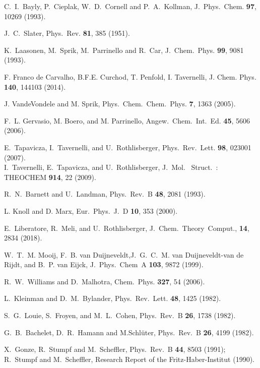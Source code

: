 \documentclass[twoside,10pt,titlepage,a4paper]{article}
\begin{document}
\begin{thebibliography}{999}
    C.~I.~Bayly, P.~Cieplak, W.~D.~Cornell and P.~A.~Kollman,
    J.~Phys.~Chem. {\bf 97}, 10269 (1993).

    J.~C.~Slater, Phys.~Rev. {\bf 81}, 385 (1951).

    K.~Laasonen, M.~Sprik, M.~Parrinello and R.~Car,
    J.~Chem.~Phys. {\bf 99}, 9081 (1993).

 F. Franco de Carvalho, B.F.E. Curchod, T. Penfold, I. Tavernelli,
     J. Chem. Phys.  {\bf 140}, 144103 (2014).

 J. VandeVondele and M. Sprik,
     Phys.~Chem.~Chem.~Phys. {\bf 7}, 1363 (2005).

 F.~L. Gervasio, M. Boero, and M. Parrinello,
     Angew.~Chem.~Int.~Ed. {\bf 45}, 5606 (2006).

    E.~Tapavicza, I.~Tavernelli, and U.~Rothlisberger,
    Phys.~Rev.~Lett. {\bf 98}, 023001 (2007).\\
    I.~Tavernelli, E.~Tapavicza, and U.~Rothlisberger, 
    J.~Mol.~ Struct.~: THEOCHEM {\bf 914}, 22 (2009).

 R.~N.~Barnett and U.~Landman,
    Phys.~Rev.~B {\bf 48}, 2081 (1993).

    L. Knoll and D. Marx,
    Eur.~Phys.~J.~D {\bf 10}, 353 (2000).

   E.~Liberatore, R.~Meli, and U.~Rothlisberger,
   J.~Chem.~Theory~Comput., {\bf 14}, 2834 (2018).

    W.~T.~M. Mooij, F.~B. van Duijneveldt,J.~G.~C.~M. van Duijneveldt-van de Rijdt,
    and B.~P. van Eijck, J.~Phys.~Chem~A {\bf 103}, 9872 (1999).

    R.~W.~Williams and D.~Malhotra, Chem.~Phys. {\bf 327}, 54 (2006).

    L.~Kleinman and D.~M.~Bylander,
    Phys.~Rev.~Lett. {\bf 48}, 1425 (1982).

    S.~G.~Louie, S.~Froyen, and M.~L.~Cohen,
    Phys.~Rev.~B {\bf 26}, 1738 (1982). 

    G.~B.~Bachelet, D.~R.~Hamann and M.Schl\"uter,
    Phys.~Rev.~B {\bf 26}, 4199 (1982).

    X.~Gonze, R.~Stumpf and M.~Scheffler,
    Phys.~Rev.~B {\bf 44}, 8503 (1991);
    R.~Stumpf and M.~Scheffler,
    Research Report of the Fritz-Haber-Institut (1990).


\end{thebibliography}
\end{document}
